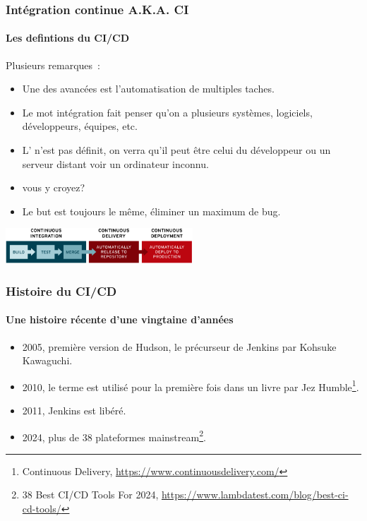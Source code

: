 \documentclass{beamer}
\begin{document}
    \begin{frame}
        \frametitle{Intégration continue A.K.A. CI}
        \framesubtitle{Les defintions du CI/CD}
        \transdissolve
        Plusieurs remarques~:
        \begin{itemize}
            \item Une des avancées est l'automatisation de multiples taches.
            \item Le mot intégration fait penser qu'on a plusieurs systèmes, logiciels, développeurs, équipes, etc.
            \item L' n'est pas définit, on verra qu'il peut être celui du développeur ou un serveur distant voir un ordinateur inconnu.
            \item {} vous y croyez?
            \item Le but est toujours le même, éliminer un maximum de bug.
        \end{itemize}
        \bigbreak
        \centering
        \includegraphics[width=7cm]{image/ci-cd-flow.png}
    \end{frame}

    \begin{frame}
        \frametitle{Histoire du CI/CD}
        \framesubtitle{Une histoire récente d'une vingtaine d'années}
        \transdissolve
        \begin{itemize}
            \item 2005, première version de Hudson, le précurseur de Jenkins par Kohsuke Kawaguchi.
            \item 2010, le terme  est utilisé pour la première fois dans un livre par Jez Humble\footnote{\label{ci}Continuous Delivery, \url{https://www.continuousdelivery.com/}}.
            \item 2011, Jenkins est libéré.
            \item 2024, plus de 38 plateformes mainstream\footnote{38 Best CI/CD Tools For 2024, \url{https://www.lambdatest.com/blog/best-ci-cd-tools/}}.
        \end{itemize}
    \end{frame}
\end{document}
